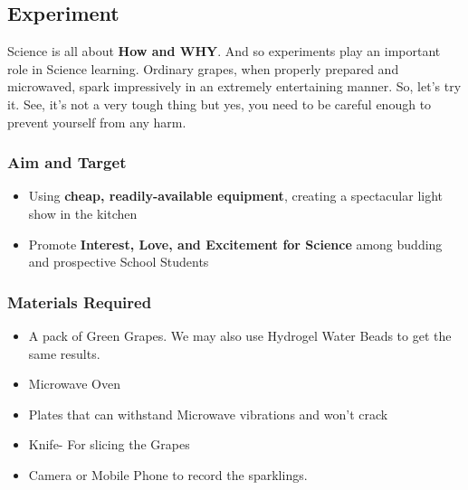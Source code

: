 \documentclass{article}
\begin{document}
\subsection{\Large Experiment}

Science is all about \textbf{How and WHY}. And so experiments play an important role in Science learning.
Ordinary grapes, when properly prepared and microwaved, spark impressively in an extremely entertaining manner. So, let's try it. See, it’s not a very tough thing but yes, you need to be careful enough to prevent yourself from any harm.

\subsubsection{\Large Aim and Target}
\begin{itemize}
\item Using \textbf{cheap, readily-available equipment}, creating a spectacular light show in the kitchen
\item Promote \textbf{Interest, Love, and Excitement for Science} among budding and prospective School Students
\end{itemize}
\subsubsection{\Large Materials Required}
\begin{itemize}
\large
    \item A pack of Green Grapes. We may also use Hydrogel Water Beads to get the same results.
    \item Microwave Oven
    \item Plates that can withstand Microwave vibrations and won't crack
    \item Knife- For slicing the Grapes
    \item Camera or Mobile Phone to record the sparklings.
    
    
\end{itemize}
\end{document}
